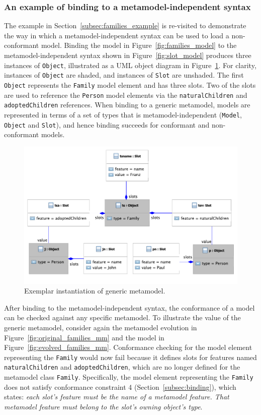 \subsubsection{An example of binding to a metamodel-independent syntax}
\label{subsec:mmi_syntax_example}
The example in Section~\ref{subsec:families_example} is re-visited to demonstrate the way in which a metamodel-independent syntax can be used to load a non-conformant model. Binding the model in Figure~\ref{fig:families_model} to the metamodel-independent syntax shown in Figure~\ref{fig:slot_model} produces three instances of \texttt{Ob\-je\-ct}, illustrated as a UML object diagram in Figure~\ref{fig:generic_binding}. For clarity, instances of \texttt{Ob\-je\-ct} are shaded, and instances of \texttt{Sl\-ot} are unshaded. The first \texttt{Ob\-je\-ct} represents the \texttt{Fa\-mi\-ly} model element and has three slots. Two of the slots are used to reference the \texttt{Pe\-rs\-on} model elements via the \texttt{na\-tu\-r\-alCh\-il\-dr\-en} and \texttt{ad\-op\-t\-edCh\-il\-dr\-en} references. When binding to a generic metamodel, models are represented in terms of a set of types that is metamodel-independent (\texttt{Mo\-d\-el}, \texttt{Ob\-je\-ct} and \texttt{Sl\-ot}), and hence binding succeeds for conformant and non-conformant models.

\begin{figure}[htbp]
  \centering
  \includegraphics[width=12cm]{5.Implementation/images/generic_binding.pdf}
  \caption{Exemplar instantiation of generic metamodel.}
  \label{fig:generic_binding}
\end{figure}

After binding to the metamodel-independent syntax, the conformance of a model can be checked against any specific metamodel. To illustrate the value of the generic metamodel, consider again the metamodel evolution in Figure~\ref{fig:original_families_mm} and the model in Figure~\ref{fig:evolved_families_mm}. Conformance checking for the model element representing the \texttt{Fa\-mi\-ly} would now fail because it defines slots for features named  \texttt{na\-tu\-r\-alCh\-il\-dr\-en} and \texttt{ad\-op\-t\-edCh\-il\-dr\-en}, which are no longer defined for the metamodel class \texttt{Fa\-mi\-ly}. Specifically, the model element representing the \texttt{Fa\-mi\-ly} does not satisfy conformance constraint 4 (Section~\ref{subsec:binding}), which states: \emph{each slot's feature must be the name of a metamodel feature. That metamodel feature must belong to the slot's owning object's type}. 

